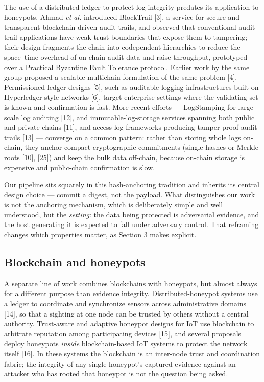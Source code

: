 \documentclass[conference]{IEEEtran}
\begin{document}
The use of a distributed ledger to protect log integrity predates its application to honeypots. Ahmad \emph{et al.} introduced BlockTrail [3], a service for secure and transparent blockchain-driven audit trails, and observed that conventional audit-trail applications have weak trust boundaries that expose them to tampering; their design fragments the chain into codependent hierarchies to reduce the space--time overhead of on-chain audit data and raise throughput, prototyped over a Practical Byzantine Fault Tolerance protocol. Earlier work by the same group proposed a scalable multichain formulation of the same problem [4]. Permissioned-ledger designs [5], such as auditable logging infrastructures built on Hyperledger-style networks [6], target enterprise settings where the validating set is known and confirmation is fast. More recent efforts --- LogStamping for large-scale log auditing [12], and immutable-log-storage services spanning both public and private chains [11], and access-log frameworks producing tamper-proof audit trails [13] --- converge on a common pattern: rather than storing whole logs on-chain, they anchor compact cryptographic commitments (single hashes or Merkle roots [10], [25]) and keep the bulk data off-chain, because on-chain storage is expensive and public-chain confirmation is slow.

Our pipeline sits squarely in this hash-anchoring tradition and inherits its central design choice --- commit a digest, not the payload. What distinguishes our work is not the anchoring mechanism, which is deliberately simple and well understood, but the \emph{setting}: the data being protected is adversarial evidence, and the host generating it is expected to fall under adversary control. That reframing changes which properties matter, as Section 3 makes explicit.

\subsection{Blockchain and honeypots}

A separate line of work combines blockchains with honeypots, but almost always for a different purpose than evidence integrity. Distributed-honeypot systems use a ledger to coordinate and synchronize sensors across administrative domains [14], so that a sighting at one node can be trusted by others without a central authority. Trust-aware and adaptive honeypot designs for IoT use blockchain to arbitrate reputation among participating devices [15], and several proposals deploy honeypots \emph{inside} blockchain-based IoT systems to protect the network itself [16]. In these systems the blockchain is an inter-node trust and coordination fabric; the integrity of any single honeypot's captured evidence against an attacker who has rooted that honeypot is not the question being asked.
\end{document}
